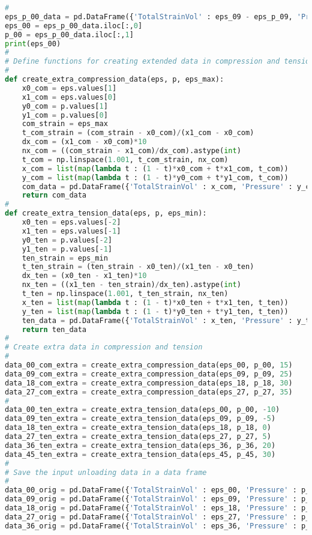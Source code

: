 \begin{lstlisting}[language=Python]
#
eps_p_00_data = pd.DataFrame({'TotalStrainVol' : eps_09 - eps_p_09, 'Pressure' : p_09})
eps_00 = eps_p_00_data.iloc[:,0]
p_00 = eps_p_00_data.iloc[:,1]
print(eps_00)
#
# Define functions for creating extended data in compression and tension
#
def create_extra_compression_data(eps, p, eps_max):
    x0_com = eps.values[1]
    x1_com = eps.values[0]
    y0_com = p.values[1]
    y1_com = p.values[0]
    com_strain = eps_max
    t_com_strain = (com_strain - x0_com)/(x1_com - x0_com)
    dx_com = (x1_com - x0_com)*10
    nx_com = ((com_strain - x1_com)/dx_com).astype(int)
    t_com = np.linspace(1.001, t_com_strain, nx_com)
    x_com = list(map(lambda t : (1 - t)*x0_com + t*x1_com, t_com))
    y_com = list(map(lambda t : (1 - t)*y0_com + t*y1_com, t_com))
    com_data = pd.DataFrame({'TotalStrainVol' : x_com, 'Pressure' : y_com})
    return com_data
#
def create_extra_tension_data(eps, p, eps_min):
    x0_ten = eps.values[-2]
    x1_ten = eps.values[-1]
    y0_ten = p.values[-2]
    y1_ten = p.values[-1]
    ten_strain = eps_min
    t_ten_strain = (ten_strain - x0_ten)/(x1_ten - x0_ten)
    dx_ten = (x0_ten - x1_ten)*10
    nx_ten = ((x1_ten - ten_strain)/dx_ten).astype(int)
    t_ten = np.linspace(1.001, t_ten_strain, nx_ten)
    x_ten = list(map(lambda t : (1 - t)*x0_ten + t*x1_ten, t_ten))
    y_ten = list(map(lambda t : (1 - t)*y0_ten + t*y1_ten, t_ten))
    ten_data = pd.DataFrame({'TotalStrainVol' : x_ten, 'Pressure' : y_ten})
    return ten_data
#
# Create extra data in compression and tension
#
data_00_com_extra = create_extra_compression_data(eps_00, p_00, 15)
data_09_com_extra = create_extra_compression_data(eps_09, p_09, 25)
data_18_com_extra = create_extra_compression_data(eps_18, p_18, 30)
data_27_com_extra = create_extra_compression_data(eps_27, p_27, 35)
#
data_00_ten_extra = create_extra_tension_data(eps_00, p_00, -10)
data_09_ten_extra = create_extra_tension_data(eps_09, p_09, -5)
data_18_ten_extra = create_extra_tension_data(eps_18, p_18, 0)
data_27_ten_extra = create_extra_tension_data(eps_27, p_27, 5)
data_36_ten_extra = create_extra_tension_data(eps_36, p_36, 20)
data_45_ten_extra = create_extra_tension_data(eps_45, p_45, 30)
#
# Save the input unloading data in a data frame
#
data_00_orig = pd.DataFrame({'TotalStrainVol' : eps_00, 'Pressure' : p_00})
data_09_orig = pd.DataFrame({'TotalStrainVol' : eps_09, 'Pressure' : p_09})
data_18_orig = pd.DataFrame({'TotalStrainVol' : eps_18, 'Pressure' : p_18})
data_27_orig = pd.DataFrame({'TotalStrainVol' : eps_27, 'Pressure' : p_27})
data_36_orig = pd.DataFrame({'TotalStrainVol' : eps_36, 'Pressure' : p_36})

\end{lstlisting}
